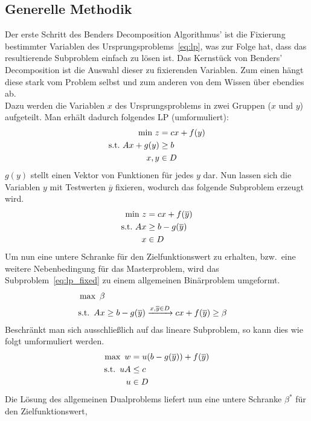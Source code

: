 \documentclass[a4paper, 11pt]{scrreprt}
\begin{document}
\subsection*{Generelle Methodik}
Der erste Schritt des Benders Decomposition Algorithmus' ist die Fixierung bestimmter
Variablen des Ursprungsproblems~\ref{eq:lp}, was zur Folge hat, dass das resultierende
Subproblem einfach zu lösen ist. Das Kernstück von Benders' Decomposition ist die
Auswahl dieser zu fixierenden Variablen. Zum einen hängt diese stark vom Problem
selbst und zum anderen von dem Wissen über ebendies ab.\\
Dazu werden die Variablen $x$ des Ursprungsproblems in zwei Gruppen ($x$ und $y$) aufgeteilt.
Man erhält dadurch folgendes LP (umformuliert):
\begin{align}
  \label{eq:lp_split}
  \text{min}\,\, z &= cx + f(y)\notag\\
  \text{s.t.}\,\, Ax + g(y) &\geq b \\
  x, y &\in D\notag
\end{align}
$g(y)$ stellt einen Vektor von Funktionen für jedes $y$ dar. Nun lassen sich die Variablen $y$
mit Testwerten $\overline{y}$ fixieren, wodurch das folgende Subproblem erzeugt wird.
\begin{align}
  \label{eq:lp_fixed}
  \text{min}\,\, z &= cx + f(\overline{y})\notag\\
  \text{s.t.}\,\, Ax &\geq b - g(\overline{y})\\
  x &\in D\notag
\end{align}
Um nun eine untere Schranke für den Zielfunktionswert zu erhalten, bzw.\ eine weitere Nebenbedingung
für das Masterproblem, wird das Subproblem~\ref{eq:lp_fixed} zu einem allgemeinen Binärproblem
umgeformt.
\begin{align}
  \label{eq:sub_dual}
  \text{max}\,\,\, \beta\\
  \text{s.t.}\,\,\, Ax &\geq b - g(\overline{y}) \xrightarrow{x, \overline{y} \in D} cx + f(\overline{y}) \geq \beta\notag
\end{align}
Beschränkt man sich ausschließlich auf das lineare Subproblem, so kann dies wie folgt umformuliert werden.
\begin{align}
  \label{eq:sub_dual_linear}
  \text{max}\,\,\, w &= u(b - g(\overline{y})) + f(\overline{y})\notag\\
  \text{s.t.}\,\,\, uA &\leq c\\
  u &\in D\notag
\end{align}
Die Lösung des allgemeinen Dualproblems liefert nun eine untere Schranke $\beta^*$ für den Zielfunktionswert,
\end{document}
